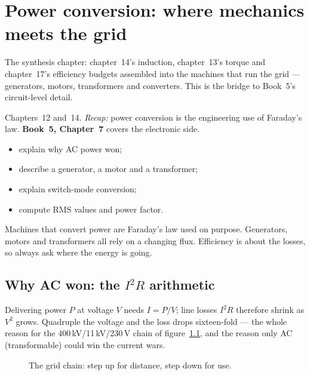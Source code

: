 \chapter{Power conversion: where mechanics meets the grid}\label{ch:power}

The synthesis chapter: chapter~14's induction, chapter~13's torque and
chapter~17's efficiency budgets assembled into the machines that run
the grid --- generators, motors, transformers and converters. This is
the bridge to Book~5's circuit-level detail.

\begin{rulebox}
Chapters~12 and~14. \emph{Recap:} power conversion is the engineering use of Faraday's law. \textbf{Book~5, Chapter~7} covers the electronic side.
\end{rulebox}
\begin{wins}
\begin{itemize}
\item explain why AC power won;
\item describe a generator, a motor and a transformer;
\item explain switch-mode conversion;
\item compute RMS values and power factor.
\end{itemize}
\end{wins}
\begin{principle}
Machines that convert power are Faraday's law used on purpose. Generators, motors and transformers all rely on a changing flux. Efficiency is about the losses, so always ask where the energy is going.
\end{principle}

\section{Why AC won: the $I^{2}R$ arithmetic}\label{sec:pw-ac}

Delivering power $P$ at voltage $V$ needs $I=P/V$; line losses
$I^{2}R$ therefore shrink as $V^{2}$ grows. Quadruple the voltage and
the loss drops sixteen-fold --- the whole reason for the
400\,kV/11\,kV/230\,V chain of figure~\ref{fig:grid}, and the reason
only AC (transformable) could win the current wars.

\begin{figure}[htbp]\centering

\caption{The grid chain: step up for distance, step down for use.}
\label{fig:grid}
\end{figure}

